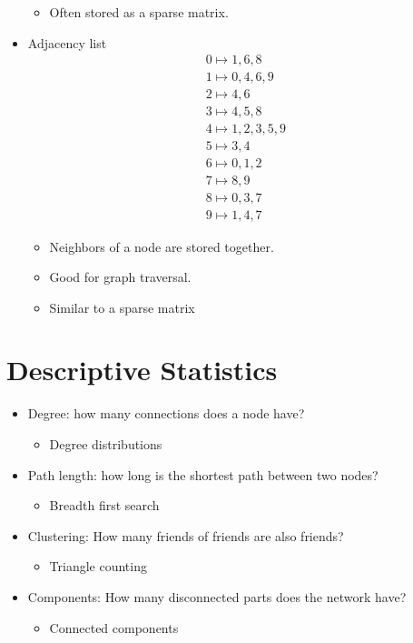 \begin{itemize}
\begin{itemize}
		\item Often stored as a sparse matrix.
	\end{itemize}
	\item Adjacency list
	\begin{align*}
	0 \mapsto 1, 6, 8\\
	1 \mapsto 0, 4, 6, 9\\
	2 \mapsto 4, 6\\
	3 \mapsto 4, 5, 8\\
	4 \mapsto 1, 2, 3, 5, 9\\
	5 \mapsto 3,4\\
	6 \mapsto 0,1,2\\
	7 \mapsto 8,9\\
	8 \mapsto 0,3,7\\
	9 \mapsto 1,4,7
	\end{align*}
	\begin{itemize}
		\item Neighbors of a node are stored together.
		\item Good for graph traversal.
		\item Similar to a sparse matrix
	\end{itemize}
\end{itemize}

\section{Descriptive Statistics}
\begin{itemize}
	\item Degree: how many connections does a node have?
	\begin{itemize}
		\item Degree distributions
	\end{itemize}
	\item Path length: how long is the shortest path between two nodes?
	\begin{itemize}
		\item Breadth first search
	\end{itemize}
	\item Clustering: How many friends of friends are also friends?
	\begin{itemize}
		\item Triangle counting
	\end{itemize}
	\item Components: How many disconnected parts does the network have?
	\begin{itemize}
		\item Connected components
	\end{itemize}
\end{itemize}

